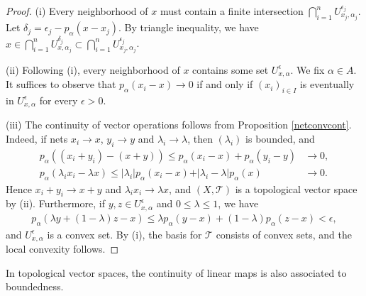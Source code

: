 \documentclass{article}
\numberwithin{equation}{section}
\renewcommand{\cal}{\mathcal}
\theoremstyle{plain}
\theoremstyle{definition}
\begin{document}
\begin{proof}
(i) Every neighborhood of $x$ must contain a finite intersection $\bigcap_{i=1}^n U_{x_j,\alpha_j}^{\epsilon_j}$. Let $\delta_j=\epsilon_j-p_\alpha(x-x_j)$. By triangle inequality, we have $x\in\bigcap_{i=1}^n U_{x,\alpha_j}^{\delta_j}\subset\bigcap_{i=1}^n U_{x_j,\alpha_j}^{\epsilon_j}$.

(ii) Following (i), every neighborhood of $x$ contains some set $U_{x,\alpha}^\epsilon$. We fix $\alpha\in A$. It suffices to observe that $p_\alpha(x_i-x)\to 0$ if and only if $(x_i)_{i\in I}$ is eventually in $U_{x,\alpha}^\epsilon$ for every $\epsilon>0$.

(iii) The continuity of vector operations follows from Proposition \ref{netconvcont}. Indeed, if nets $x_i\to x$, $y_i\to y$ and $\lambda_i\to\lambda$, then $(\lambda_i)$ is bounded, and
\begin{align*}
	p_\alpha((x_i+y_i)-(x+y))\leq p_\alpha(x_i-x)+p_\alpha(y_i-y)&\to 0,\\
	p_\alpha(\lambda_i x_i-\lambda x)\leq \vert\lambda_i\vert p_\alpha(x_i-x)+\vert\lambda_i-\lambda\vert p_\alpha(x)&\to 0.
\end{align*}
Hence $x_i+y_i\to x+y$ and $\lambda_ix_i\to\lambda x$, and $(X,\cal{T})$ is a topological vector space by (ii). Furthermore, if $y,z\in U_{x,\alpha}^\epsilon$ and $0\leq\lambda\leq 1$, we have
\begin{align*}
	p_\alpha(\lambda y+(1-\lambda)z-x)\leq\lambda p_\alpha(y-x)+(1-\lambda)p_\alpha(z-x)<\epsilon,
\end{align*}
and $U_{x,\alpha}^\epsilon$ is a convex set. By (i), the basis for $\cal{T}$ consists of convex sets, and the local convexity follows.
\end{proof}

In topological vector spaces, the continuity of linear maps is also associated to boundedness.
\end{document}
